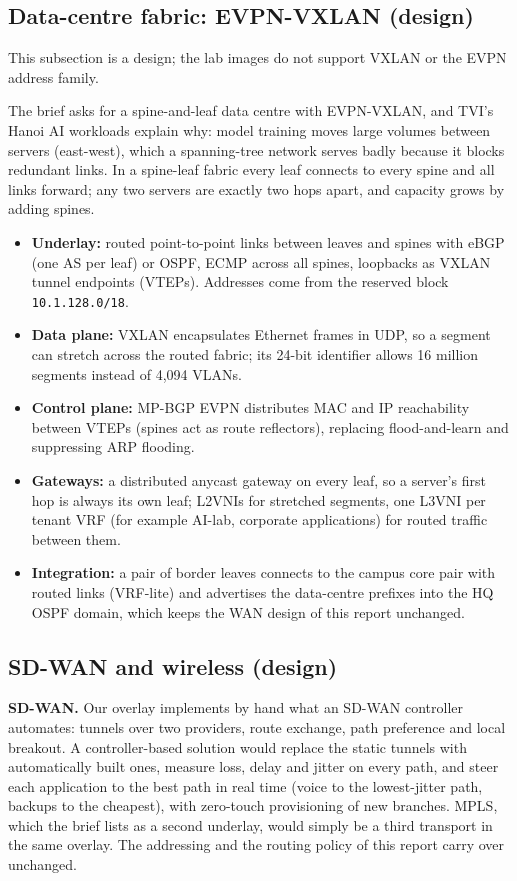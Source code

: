 \subsection{Data-centre fabric: EVPN-VXLAN (design)}\label{sec:evpn}
This subsection is a design; the lab images do not support VXLAN or the EVPN address family.

The brief asks for a spine-and-leaf data centre with EVPN-VXLAN, and TVI's Hanoi AI workloads explain why:
model training moves large volumes between servers (east-west), which a spanning-tree network serves badly
because it blocks redundant links. In a spine-leaf fabric every leaf connects to every spine and all links
forward; any two servers are exactly two hops apart, and capacity grows by adding spines.

\begin{itemize}
  \item \textbf{Underlay:} routed point-to-point links between leaves and spines with eBGP (one AS per leaf)
        or OSPF, ECMP across all spines, loopbacks as VXLAN tunnel endpoints (VTEPs). Addresses come from the
        reserved block \texttt{10.1.128.0/18}.
  \item \textbf{Data plane:} VXLAN \cite{rfc7348} encapsulates Ethernet frames in UDP, so a segment can stretch
        across the routed fabric; its 24-bit identifier allows 16 million segments instead of 4{,}094 VLANs.
  \item \textbf{Control plane:} MP-BGP EVPN \cite{rfc7432,rfc8365} distributes MAC and IP reachability between
        VTEPs (spines act as route reflectors), replacing flood-and-learn and suppressing ARP flooding.
  \item \textbf{Gateways:} a distributed anycast gateway on every leaf, so a server's first hop is always its
        own leaf; L2VNIs for stretched segments, one L3VNI per tenant VRF (for example AI-lab, corporate
        applications) for routed traffic between them.
  \item \textbf{Integration:} a pair of border leaves connects to the campus core pair with routed links
        (VRF-lite) and advertises the data-centre prefixes into the HQ OSPF domain, which keeps the WAN design of
        this report unchanged.
\end{itemize}

\subsection{SD-WAN and wireless (design)}\label{sec:sdwan}
\textbf{SD-WAN.} Our overlay implements by hand what an SD-WAN controller automates: tunnels over two
providers, route exchange, path preference and local breakout. A controller-based solution would replace
the static tunnels with automatically built ones, measure loss, delay and jitter on every path, and steer
each application to the best path in real time (voice to the lowest-jitter path, backups to the cheapest),
with zero-touch provisioning of new branches. MPLS, which the brief lists as a second underlay, would
simply be a third transport in the same overlay. The addressing and the routing policy of this report
carry over unchanged.

